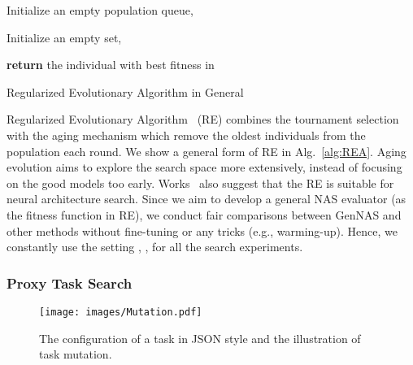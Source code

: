 \documentclass{article}
\begin{document}
\begin{algorithm}[]
\small
\SetAlgoLined


 Initialize an empty population queue,  
 
 Initialize an empty set,  
 
 
 
 \textbf{return} the individual with best fitness in 
\caption{\label{alg:REA} Regularized Evolutionary Algorithm in  General}
\end{algorithm}

Regularized Evolutionary Algorithm~\cite{real2019regularized} (RE) combines the tournament selection~\cite{goldberg1991comparative} with the aging mechanism which remove the oldest individuals from the population each round. We show a general form of RE in Alg.~\ref{alg:REA}. Aging evolution aims to explore the search space more extensively, instead of focusing on the good models too early. Works~\cite{dong2020bench,ying2019bench,chen2019renas} also suggest that the RE is suitable for neural architecture search. Since we aim to develop a general NAS evaluator (as the fitness function in RE), we conduct fair comparisons between GenNAS and other methods without fine-tuning or any tricks (e.g., warming-up). Hence, we constantly use the setting , ,  for all the search experiments.

\subsubsection{Proxy Task Search}


\begin{figure}[h]
  \centering
  \texttt{[image: images/Mutation.pdf]}
  \caption{The configuration of a task in JSON style and the illustration of task mutation.}
  \label{fig:task_illustration}
\end{figure}
\end{document}

